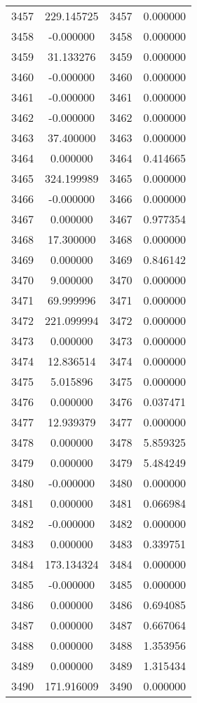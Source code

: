 \documentclass[12pt]{article}
\begin{document}
\begin{longtable}{@{}cccc@{}}
3457 & 229.145725 & 3457 & 0.000000 \\
3458 & -0.000000 & 3458 & 0.000000 \\
3459 & 31.133276 & 3459 & 0.000000 \\
3460 & -0.000000 & 3460 & 0.000000 \\
3461 & -0.000000 & 3461 & 0.000000 \\
3462 & -0.000000 & 3462 & 0.000000 \\
3463 & 37.400000 & 3463 & 0.000000 \\
3464 & 0.000000 & 3464 & 0.414665 \\
3465 & 324.199989 & 3465 & 0.000000 \\
3466 & -0.000000 & 3466 & 0.000000 \\
3467 & 0.000000 & 3467 & 0.977354 \\
3468 & 17.300000 & 3468 & 0.000000 \\
3469 & 0.000000 & 3469 & 0.846142 \\
3470 & 9.000000 & 3470 & 0.000000 \\
3471 & 69.999996 & 3471 & 0.000000 \\
3472 & 221.099994 & 3472 & 0.000000 \\
3473 & 0.000000 & 3473 & 0.000000 \\
3474 & 12.836514 & 3474 & 0.000000 \\
3475 & 5.015896 & 3475 & 0.000000 \\
3476 & 0.000000 & 3476 & 0.037471 \\
3477 & 12.939379 & 3477 & 0.000000 \\
3478 & 0.000000 & 3478 & 5.859325 \\
3479 & 0.000000 & 3479 & 5.484249 \\
3480 & -0.000000 & 3480 & 0.000000 \\
3481 & 0.000000 & 3481 & 0.066984 \\
3482 & -0.000000 & 3482 & 0.000000 \\
3483 & 0.000000 & 3483 & 0.339751 \\
3484 & 173.134324 & 3484 & 0.000000 \\
3485 & -0.000000 & 3485 & 0.000000 \\
3486 & 0.000000 & 3486 & 0.694085 \\
3487 & 0.000000 & 3487 & 0.667064 \\
3488 & 0.000000 & 3488 & 1.353956 \\
3489 & 0.000000 & 3489 & 1.315434 \\
3490 & 171.916009 & 3490 & 0.000000 \\

\end{longtable}
\end{document}
